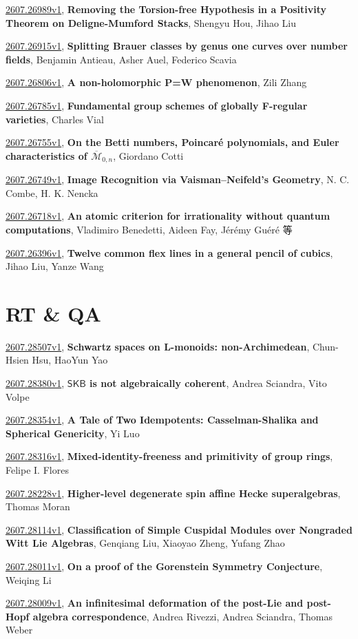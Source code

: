 \documentclass[9pt, a4paper]{article}
\theoremstyle{plain}
\theoremstyle{definition}
\theoremstyle{remark}
\newcommand{\arxiv}[3]{\href{https://arxiv.org/abs/#1}{#1}, \textbf{\textcolor{arxivblue}{#2}}, #3}
\begin{document}
\arxiv{2607.26989v1}{Removing the Torsion-free Hypothesis in a Positivity Theorem on Deligne-Mumford Stacks}{Shengyu Hou, Jihao Liu}

\arxiv{2607.26915v1}{Splitting Brauer classes by genus one curves over number fields}{Benjamin Antieau, Asher Auel, Federico Scavia}

\arxiv{2607.26806v1}{A non-holomorphic P=W phenomenon}{Zili Zhang}

\arxiv{2607.26785v1}{Fundamental group schemes of globally F-regular varieties}{Charles Vial}

\arxiv{2607.26755v1}{On the Betti numbers, Poincaré polynomials, and Euler characteristics of $\overline{\mathcal M}_{0,n}$}{Giordano Cotti}

\arxiv{2607.26749v1}{Image Recognition via Vaisman--Neifeld's Geometry}{N. C. Combe, H. K. Nencka}

\arxiv{2607.26718v1}{An atomic criterion for irrationality without quantum computations}{Vladimiro Benedetti, Aideen Fay, Jérémy Guéré 等}

\arxiv{2607.26396v1}{Twelve common flex lines in a general pencil of cubics}{Jihao Liu, Yanze Wang}


\section{RT \& QA}
\arxiv{2607.28507v1}{Schwartz spaces on L-monoids: non-Archimedean}{Chun-Hsien Hsu, HaoYun Yao}

\arxiv{2607.28380v1}{$\mathsf{SKB}$ is not algebraically coherent}{Andrea Sciandra, Vito Volpe}

\arxiv{2607.28354v1}{A Tale of Two Idempotents: Casselman-Shalika and Spherical Genericity}{Yi Luo}

\arxiv{2607.28316v1}{Mixed-identity-freeness and primitivity of group rings}{Felipe I. Flores}

\arxiv{2607.28228v1}{Higher-level degenerate spin affine Hecke superalgebras}{Thomas Moran}

\arxiv{2607.28114v1}{Classification of Simple Cuspidal Modules over Nongraded Witt Lie Algebras}{Genqiang Liu, Xiaoyao Zheng, Yufang Zhao}

\arxiv{2607.28011v1}{On a proof of the Gorenstein Symmetry Conjecture}{Weiqing Li}

\arxiv{2607.28009v1}{An infinitesimal deformation of the post-Lie and post-Hopf algebra correspondence}{Andrea Rivezzi, Andrea Sciandra, Thomas Weber}
\end{document}
